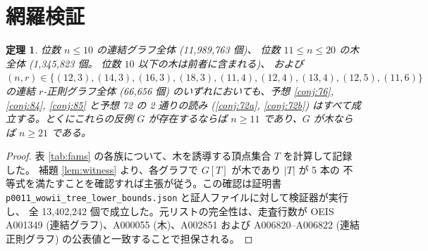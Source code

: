 \documentclass[paper=a4,fontsize=10.5pt,jafontsize=10.5pt]{jlreq}
\theoremstyle{plain}
\newtheorem{theorem}{定理}[section]
\theoremstyle{definition}
\begin{document}
\section{網羅検証}

\begin{theorem}\label{thm:main}
位数 $n \le 10$ の連結グラフ全体 (11,989,763 個)、
位数 $11 \le n \le 20$ の木全体 (1,345,823 個。
位数 $10$ 以下の木は前者に含まれる)、
および $(n, r) \in \{(12, 3), (14, 3), (16, 3), (18, 3), (11, 4), (12, 4), (13, 4), (12, 5), (11, 6)\}$ の連結 $r$-正則グラフ全体
(66,656 個) のいずれにおいても、予想 \ref{conj:76}, \ref{conj:84},
\ref{conj:85} と予想 72 の 2 通りの読み (\ref{conj:72a},
\ref{conj:72b}) はすべて成立する。とくにこれらの反例 $G$ が存在するならば
$n \ge 11$ であり、$G$ が木ならば $n \ge 21$ である。
\end{theorem}

\begin{proof}
表 \ref{tab:fams} の各族について、木を誘導する頂点集合 $T$ を計算して記録した。
補題 \ref{lem:witness} より、各グラフで $G[T]$ が木であり $|T|$ が 5 本の
不等式を満たすことを確認すれば主張が従う。この確認は証明書
\texttt{p0011\_wowii\_tree\_lower\_bounds.json} と証人ファイルに対して検証器が実行し、
全 13,402,242 個で成立した。元リストの完全性は、走査行数が
OEIS A001349 (連結グラフ)、A000055 (木)、A002851 および
A006820--A006822 (連結正則グラフ) の公表値と一致することで担保される。
\end{proof}
\end{document}
